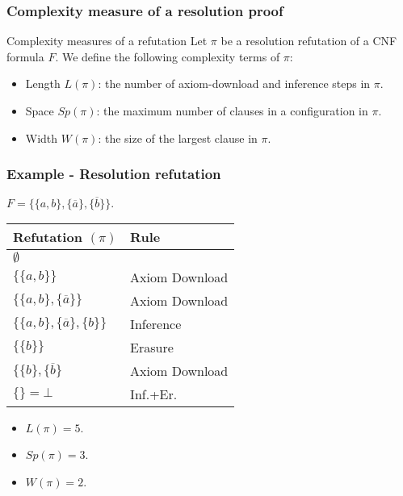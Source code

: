 \documentclass[t,usenames,dvipsnames]{beamer}
\begin{document}
\begin{frame}\frametitle{Complexity measure of a resolution proof}
	\begin{block}{Complexity measures of a refutation}
		Let $\pi$ be a resolution refutation of a CNF formula $F$. We define the
		following complexity terms of $\pi$:
		\begin{itemize}[<+->]
			\item Length $L(\pi)$: the number of axiom-download and
				inference steps in $\pi$.
			\item Space $Sp(\pi)$: the maximum number of clauses in a
				configuration in $\pi$.
			\item Width $W(\pi)$: the size of the largest clause in $\pi$.
		\end{itemize}
		
	\end{block}
\end{frame}
\begin{frame}\frametitle{Example - Resolution refutation}
	$F = \{ \{a, b\}, \{\overline a\}, \{\overline b\}\}.$ \pause
	\begin{center}
	\begin{tabular}{p{}|p{}}
		Refutation  $(\pi)$ & Rule\\ 
		\midrule
		$\emptyset$ &\\
		$\{\{a, b\}\}$ & Axiom Download\\
		$\{\{a, b\}, \{\overline a\}\}$ & Axiom Download\\
		$\{\{a, b\}, \{\overline a\}, \{b\}\}$ & Inference\\
		$\{\{b\}\}$ & Erasure\\
		$\{\{b\}, \{\overline b\}$ & Axiom Download\\
		$\{\} = \bot$& Inf.+Er.\\
	  \end{tabular}
	\end{center} \pause
	\begin{itemize}[<+->]
		\item $L(\pi) = 5$.
		\item $Sp(\pi) = 3$.
		\item $W(\pi) = 2$.
	\end{itemize}
\end{frame}
\end{document}
